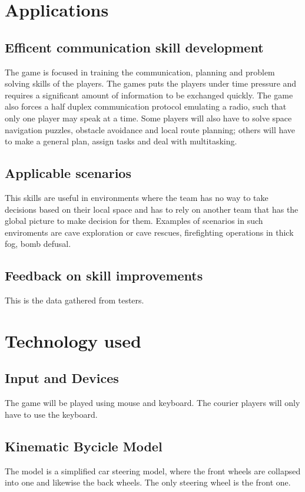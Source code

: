 \documentclass{article}
\begin{document}
\clearpage

\section{Applications}
\subsection{Efficent communication skill development}
The game is focused in training the communication, planning and problem solving skills of the players. The games puts the players under time pressure and requires a significant amount of information to be exchanged quickly. The game also forces a half duplex communication protocol emulating a radio, such that only one player may speak at a time. Some players will also have to solve space navigation puzzles, obstacle avoidance and local route planning; others will have to make a general plan, assign tasks and deal with multitasking.
\subsection{Applicable scenarios}
This skills are useful in environments where the team has no way to take decisions based on their local space and has to rely on another team that has the global picture to make decision for them. Examples of scenarios in such enviroments are cave exploration or cave rescues, firefighting operations in thick fog, bomb defusal. 
\subsection{Feedback on skill improvements}
This is the data gathered from testers.

\clearpage

\section{Technology used}
\subsection{Input and Devices}
The game will be played using mouse and keyboard. The courier players will only have to use the keyboard.
\subsection{Kinematic Bycicle Model \cite{kbm}}
The model is a simplified car steering model, where the front wheels are collapsed into one and likewise the back wheels. The only steering wheel is the front one. \\
\end{document}
